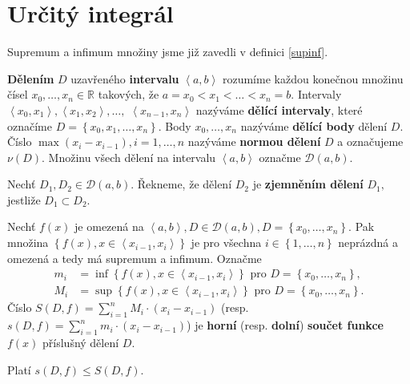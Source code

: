 \section{Určitý integrál}
\begin{pozn}
    Supremum a infimum množiny jsme již zavedli v definici \ref{supinf}.
\end{pozn}

\begin{definition}
\textbf{Dělením} $D$ uzavřeného \textbf{intervalu} $\left < a,b \right > $
rozumíme každou konečnou množinu čísel $x_0,\dots,x_n \in \mathbb R$ takových, že
$a=x_0<x_1<\dots<x_n=b.$ Intervaly $\left < x_0, x_1 \right > ,
\left < x_1, x_2 \right >, \dots,$ $\left < x_{n-1}, x_n \right >  $ nazýváme
\textbf{dělící intervaly}, které označíme $D=\left \{ x_0,x_1,\dots,x_n \right \} .$
Body $x_0,\dots,x_n$ nazýváme \textbf{dělící body} dělení $D$. Číslo
$\max \left ( x_i-x_{i-1} \right ), i=1,\dots,n $ nazýváme \textbf{normou dělení}
$D$ a označujeme $\nu(D).$ Množinu všech dělení na intervalu $\left < a,b \right > $
označme $\mathscr D(a,b).$
\end{definition}

\begin{definition}
Nechť $D_1, D_2 \in \mathscr D(a,b)$. Řekneme, že dělení $D_2$ je \textbf{zjemněním
dělení} $D_1,$ jestliže $D_1 \subset D_2.$
\end{definition}

\begin{definition}
Nechť $f(x)$ je omezená na $\left < a,b \right > , D\in \mathscr D(a,b),
D=\left \{ x_0,\dots,x_n \right \}. $ Pak množina $\left \{ f(x),
x \in \left < x_{i-1},x_i \right >  \right \} $ je pro všechna $i \in \left \{
1,\dots,n\right \} $ neprázdná a omezená a tedy má supremum a infimum.
Označme
\begin{align*}
    m_i &= \inf \left \{ f(x), x \in \left < x_{i-1},x_i \right >  \right \} \textrm{ pro } D=\left \{ x_0,\dots,x_n \right \},\\
    M_i &=   \sup \left \{ f(x), x \in \left < x_{i-1},x_i \right >  \right \} \textrm{ pro } D=\left \{ x_0,\dots,x_n \right \}.
\end{align*}
Číslo $S(D,f)=\sum_{i=1}^n M_i\cdot (x_i-x_{i-1})$
(resp. $s(D,f)=\sum_{i=1}^n m_i\cdot (x_i-x_{i-1})$) je \textbf{horní} (resp. \textbf{dolní}) \textbf{součet funkce}
$f(x)$ příslušný dělení $D$.
\end{definition}

\begin{pozn}
    Platí $s(D,f)\leq S(D,f).$
\end{pozn}

